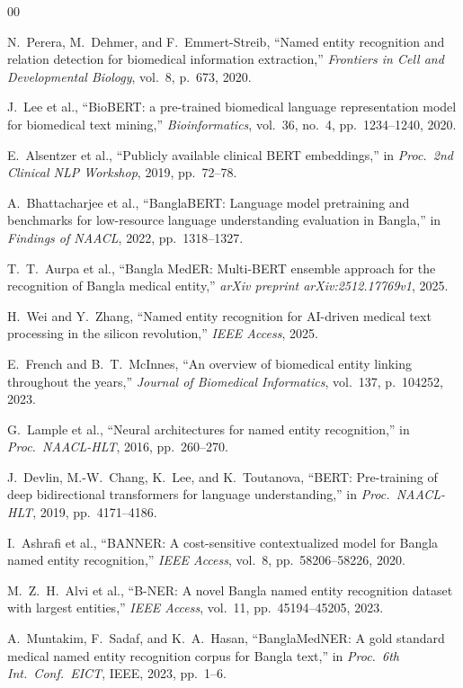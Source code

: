 \documentclass[conference]{IEEEtran}
\begin{document}
\begin{thebibliography}{00}

N.~Perera, M.~Dehmer, and F.~Emmert-Streib,
``Named entity recognition and relation detection for biomedical information extraction,''
\textit{Frontiers in Cell and Developmental Biology},
vol.~8, p.~673, 2020.

J.~Lee et al.,
``BioBERT: a pre-trained biomedical language representation model for biomedical text mining,''
\textit{Bioinformatics},
vol.~36, no.~4, pp.~1234--1240, 2020.

E.~Alsentzer et al.,
``Publicly available clinical BERT embeddings,''
in \textit{Proc.\ 2nd Clinical NLP Workshop}, 2019, pp.~72--78.

A.~Bhattacharjee et al.,
``BanglaBERT: Language model pretraining and benchmarks for low-resource language understanding evaluation in Bangla,''
in \textit{Findings of NAACL}, 2022, pp.~1318--1327.

T.~T.~Aurpa et al.,
``Bangla MedER: Multi-BERT ensemble approach for the recognition of Bangla medical entity,''
\textit{arXiv preprint arXiv:2512.17769v1}, 2025.

H.~Wei and Y.~Zhang,
``Named entity recognition for AI-driven medical text processing in the silicon revolution,''
\textit{IEEE Access}, 2025.

E.~French and B.~T.~McInnes,
``An overview of biomedical entity linking throughout the years,''
\textit{Journal of Biomedical Informatics},
vol.~137, p.~104252, 2023.

G.~Lample et al.,
``Neural architectures for named entity recognition,''
in \textit{Proc.\ NAACL-HLT}, 2016, pp.~260--270.

J.~Devlin, M.-W.~Chang, K.~Lee, and K.~Toutanova,
``BERT: Pre-training of deep bidirectional transformers for language understanding,''
in \textit{Proc.\ NAACL-HLT}, 2019, pp.~4171--4186.

I.~Ashrafi et al.,
``BANNER: A cost-sensitive contextualized model for Bangla named entity recognition,''
\textit{IEEE Access}, vol.~8, pp.~58206--58226, 2020.

M.~Z.~H.~Alvi et al.,
``B-NER: A novel Bangla named entity recognition dataset with largest entities,''
\textit{IEEE Access}, vol.~11, pp.~45194--45205, 2023.

A.~Muntakim, F.~Sadaf, and K.~A.~Hasan,
``BanglaMedNER: A gold standard medical named entity recognition corpus for Bangla text,''
in \textit{Proc.\ 6th Int.\ Conf.\ EICT}, IEEE, 2023, pp.~1--6.


\end{thebibliography}
\end{document}
